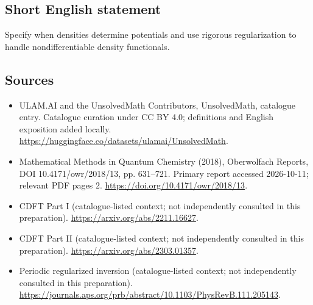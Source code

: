 \documentclass[11pt]{article}
\begin{document}
\subsection{Short English statement}
Specify when densities determine potentials and use rigorous regularization to handle nondifferentiable density functionals.
\subsection{Sources}
\begin{itemize}
\item[\hypertarget{source:statement:1}{S1}] ULAM.AI and the UnsolvedMath Contributors, UnsolvedMath, catalogue entry. Catalogue curation under CC BY 4.0; definitions and English exposition added locally.
\url{https://huggingface.co/datasets/ulamai/UnsolvedMath}.
\item[\hypertarget{source:statement:2}{S2}] Mathematical Methods in Quantum Chemistry (2018), Oberwolfach Reports, DOI 10.4171/owr/2018/13, pp. 631--721. Primary report accessed 2026-10-11; relevant PDF pages 2.
\url{https://doi.org/10.4171/owr/2018/13}.
\item[\hypertarget{source:statement:3}{S3}] CDFT Part I (catalogue-listed context; not independently consulted in this preparation).
\url{https://arxiv.org/abs/2211.16627}.
\item[\hypertarget{source:statement:4}{S4}] CDFT Part II (catalogue-listed context; not independently consulted in this preparation).
\url{https://arxiv.org/abs/2303.01357}.
\item[\hypertarget{source:statement:5}{S5}] Periodic regularized inversion (catalogue-listed context; not independently consulted in this preparation).
\url{https://journals.aps.org/prb/abstract/10.1103/PhysRevB.111.205143}.
\end{itemize}
\label{end:statement}
\end{document}
